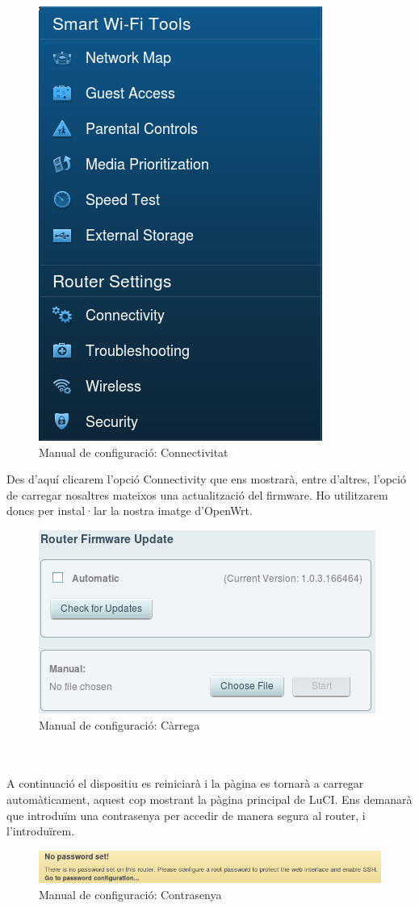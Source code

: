 \documentclass[11pt]{article}
\begin{document}
\begin{figure}[h]
		\centering
		\includegraphics[scale=0.4]{man1}
		\caption{Manual de configuració: Connectivitat}
	\end{figure}
	
Des d'aquí clicarem l'opció Connectivity que ens mostrarà, entre d'altres, l'opció de carregar nosaltres mateixos una actualització del firmware. Ho utilitzarem doncs per instal·lar la nostra imatge d'OpenWrt.
\begin{figure}[h]
		\centering
		\includegraphics[scale=0.5]{man2}
		\caption{Manual de configuració: Càrrega}
	\end{figure}
\\
\\
	A continuació el dispositiu es reiniciarà i la pàgina es tornarà a carregar automàticament, aquest cop mostrant la pàgina principal de LuCI. Ens demanarà que introduïm una contrasenya per accedir de manera segura al router, i l'introduïrem.
\begin{figure}[h]
		\centering
		\includegraphics[scale=0.5]{man3}
		\caption{Manual de configuració: Contrasenya}
	\end{figure}
\end{document}
